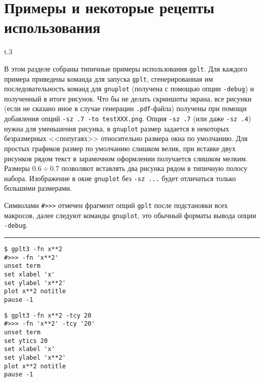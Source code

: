 \documentclass[12pt]{article}
\def\gplt{{\tt gplt}}
\def\gnuplot{{\tt gnuplot}}
\def\pdf{{\tt .pdf}}
\begin{document}
\section{Примеры и некоторые рецепты использования}
\begin{wrapfigure}[7]{t}{.3\textwidth}
  \vphantom{.}
  \vspace{-1cm}

\end{wrapfigure}
В этом разделе собраны типичные примеры использования \gplt.
Для каждого примера приведены команда для запуска \gplt, сгенерированная им последовательность команд
для \gnuplot{} (получена с помощью опции \verb'-debug') и полученный в итоге рисунок.
Что бы не делать скриншоты экрана, все рисунки (если не сказано иное в случае генерации \pdf-файла) получены при помощи добавления
опций \verb'-sz .7 -to testXXX.png'. Опция \verb'-sz .7' (или даже \verb'-sz .4') нужна для уменьшения рисунка,
в \gnuplot{} размер задается в некоторых безразмерных <<попугаях>> относительно размера окна по умолчанию.
Для простых графиков размер по умолчанию слишком велик, при вставке двух рисунков рядом текст
в зарамочном оформлении получается слишком мелким. Размеры $0.6\div0.7$ позволяют вставлять два рисунка рядом в типичную полосу набора. 
Изображение в окне \gnuplot{} без \verb'-sz ...' будет отличаться только большими размерами.

Символами \verb'#>>>' отмечен фрагмент опций \gplt{} после подстановки всех макросов, далее следуют команды \gnuplot,
это обычный форматы вывода опции \verb'-debug'.\\

\hrule %

\vspace{3mm}
\noindent
\begin{minipage}[b]{0.19\textwidth}\small
\begin{verbatim}
$ gplt3 -fn x**2 
#>>> -fn 'x**2'
unset term
set xlabel 'x'
set ylabel 'x**2'
plot x**2 notitle   
pause -1
\end{verbatim}
\end{minipage}
\hfill
\begin{minipage}[b]{0.27\textwidth}\small
\begin{verbatim}
$ gplt3 -fn x**2 -tcy 20
#>>> -fn 'x**2' -tcy '20'
unset term
set ytics 20
set xlabel 'x'
set ylabel 'x**2'
plot x**2 notitle   
pause -1
\end{verbatim}
\end{minipage}
\end{document}
